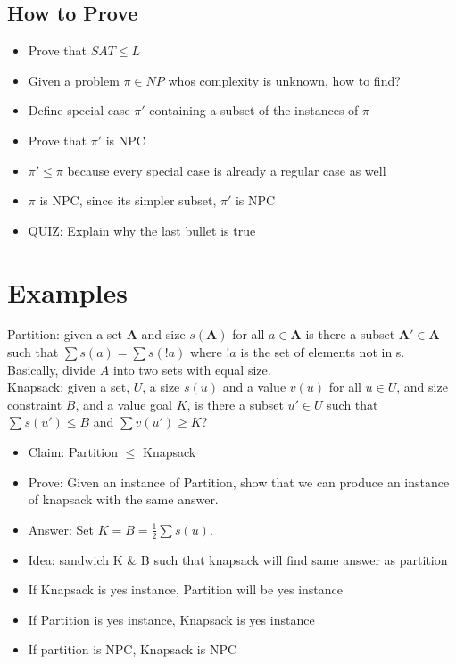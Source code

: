 \documentclass[12pt, letter]{article}
\begin{document}
\subsection*{How to Prove}
\begin{itemize}
	\item Prove that $SAT \le L$
	\item Given a problem $\pi \in NP$ whos complexity is unknown, how to find?
	\item Define special case $\pi'$ containing a subset of the instances of  $\pi$ 
	\item Prove that $\pi'$ is NPC
	\item $\pi' \le \pi$ because every special case is already a regular case as well
	\item $\pi$ is NPC, since its simpler subset, $\pi'$ is NPC
	\item QUIZ: Explain why the last bullet is true
\end{itemize}


\section{Examples}%
\label{sec:examples}
Partition: given a set \textbf{A} and size $s(\bm{A})$ for all $a \in \bm{A}$ is there a subset $\bm{A'} \in \bm{A}$ such that $\sum s(a) = \sum s(!a)$ where  $!a$ is the set of elements not in s. Basically, divide $A$ into two sets with equal size. \\

Knapsack: given a set, $U$, a size $s(u)$ and a value  $v(u)$ for all $u \in U$, and size constraint  $B$, and a value goal $K$, is there a subset $u'\in U$ such that $\sum s(u') \le B$ and $\sum v(u') \ge K$? \\

\begin{itemize}
 \item Claim: Partition $\le$ Knapsack
 \item Prove: Given an instance of Partition, show that we can produce an instance of knapsack with the same answer.
 \item Answer: Set $K=B=\frac{1}{2}\sum s(u)$.
 \item Idea: sandwich K & B such that knapsack will find same answer as partition
 \item If Knapsack is yes instance, Partition will be yes instance
 \item If Partition is yes instance, Knapsack is yes instance
 \item If partition is NPC, Knapsack is NPC
\end{itemize}
\end{document}
